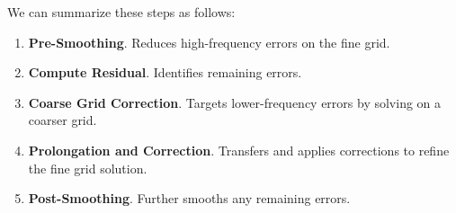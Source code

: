 We can summarize these steps as follows:
\begin{enumerate}
    \item \textbf{Pre-Smoothing}. Reduces high-frequency errors on the fine grid.

    \item \textbf{Compute Residual}. Identifies remaining errors.
    
    \item \textbf{Coarse Grid Correction}. Targets lower-frequency errors by solving on a coarser grid.
    
    \item \textbf{Prolongation and Correction}. Transfers and applies corrections to refine the fine grid solution.
    
    \item \textbf{Post-Smoothing}. Further smooths any remaining errors.
\end{enumerate}